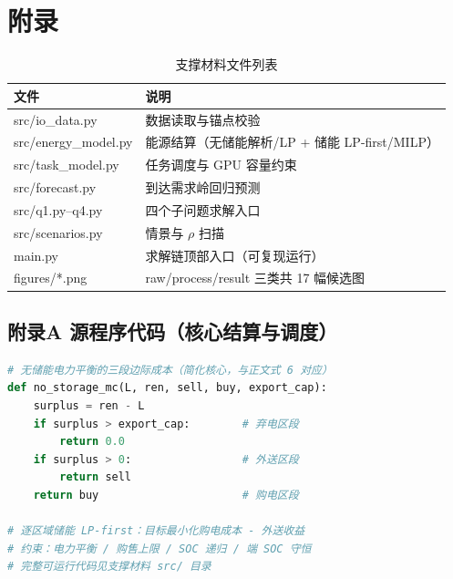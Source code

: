 \makeatletter
\let\@oldaddcontentsline\addcontentsline
\renewcommand{\addcontentsline}[3]{}
\section*{附录}
\let\addcontentsline\@oldaddcontentsline
\makeatother

\begin{table}[H]
  \centering
  \caption{支撑材料文件列表}
  \label{tab:appendix}
  \renewcommand{\arraystretch}{1.2}
  \begin{tabularx}{\textwidth}{LX}
    \toprule
    文件 & 说明 \\
    \midrule
    src/io\_data.py & 数据读取与锚点校验 \\
    src/energy\_model.py & 能源结算（无储能解析/LP + 储能 LP-first/MILP） \\
    src/task\_model.py & 任务调度与 GPU 容量约束 \\
    src/forecast.py & 到达需求岭回归预测 \\
    src/q1.py--q4.py & 四个子问题求解入口 \\
    src/scenarios.py & 情景与 $\rho$ 扫描 \\
    main.py & 求解链顶部入口（可复现运行） \\
    figures/*.png & raw/process/result 三类共 17 幅候选图 \\
    \bottomrule
  \end{tabularx}
\end{table}

\subsection*{附录A 源程序代码（核心结算与调度）}

\begin{lstlisting}[language=Python]
# 无储能电力平衡的三段边际成本（简化核心，与正文式 6 对应）
def no_storage_mc(L, ren, sell, buy, export_cap):
    surplus = ren - L
    if surplus > export_cap:        # 弃电区段
        return 0.0
    if surplus > 0:                 # 外送区段
        return sell
    return buy                      # 购电区段

# 逐区域储能 LP-first：目标最小化购电成本 - 外送收益
# 约束：电力平衡 / 购售上限 / SOC 递归 / 端 SOC 守恒
# 完整可运行代码见支撑材料 src/ 目录
\end{lstlisting}

